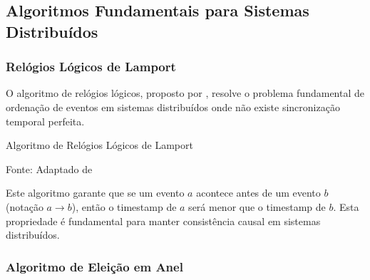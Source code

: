 \subsection{Algoritmos Fundamentais para Sistemas Distribuídos}

\subsubsection{Relógios Lógicos de Lamport}

O algoritmo de relógios lógicos, proposto por , resolve o problema fundamental de ordenação de eventos em sistemas distribuídos onde não existe sincronização temporal perfeita.

\begin{algorithm}[H]
\SetAlgoLined
{}


\caption{Algoritmo de Relógios Lógicos de Lamport}
\label{alg:lamport_clocks}
{\fontsize{10pt}{\baselineskip}\selectfont
Fonte: Adaptado de }
\end{algorithm}

Este algoritmo garante que se um evento $a$ acontece antes de um evento $b$ (notação $a \rightarrow b$), então o timestamp de $a$ será menor que o timestamp de $b$. Esta propriedade é fundamental para manter consistência causal em sistemas distribuídos.

\subsubsection{Algoritmo de Eleição em Anel}

